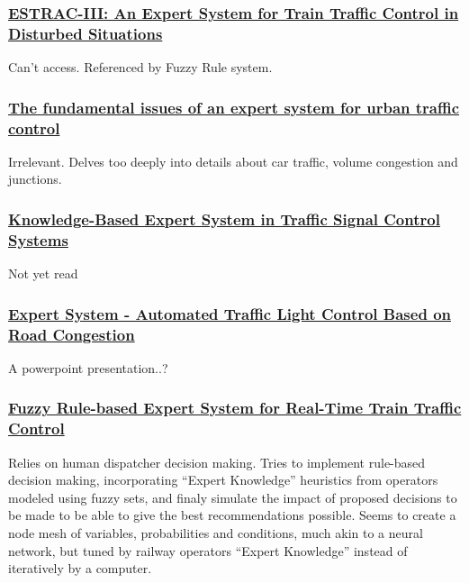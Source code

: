 \documentclass{article}
\begin{document}
\subsubsection*{\href{https://www.sciencedirect.com/science/article/pii/S1474667017526646}{ESTRAC-III: An Expert System for Train Traffic Control in Disturbed Situations}}

Can't access. Referenced by Fuzzy Rule system.

\subsubsection*{\href{https://ieeexplore.ieee.org/document/208646/}{The fundamental issues of an expert system for urban traffic control}}

Irrelevant. Delves too deeply into details about car traffic, volume congestion and junctions.

\subsubsection*{\href{http://s-space.snu.ac.kr/bitstream/10371/90495/1/5.Knowledge-Based_Expert_System_in_Traffic_Signal_Control_Systems..pdf}{Knowledge-Based Expert System in Traffic Signal Control Systems}}

Not yet read

\subsubsection*{\href{https://www.slideshare.net/KartikShenoy1/expert-system-automated-traffic-light-control-based-on-road-congestion}{Expert System - Automated Traffic Light Control Based on Road Congestion}}
A powerpoint presentation..?

\subsubsection*{\href{https://www.dcce.ibilce.unesp.br/~norian/cursos/mds/estudo_de_caso/FuzzyTrafficControl.pdf}{Fuzzy Rule-based Expert System for Real-Time Train Traffic Control}}

Relies on human dispatcher decision making. Tries to implement rule-based decision making, incorporating ``Expert Knowledge'' heuristics from operators modeled using fuzzy sets, and finaly simulate the impact of proposed decisions to be made to be able to give the best recommendations possible. Seems to create a node mesh of variables, probabilities and conditions, much akin to a neural network, but tuned by railway operators ``Expert Knowledge'' instead of iteratively by a computer.
\end{document}
